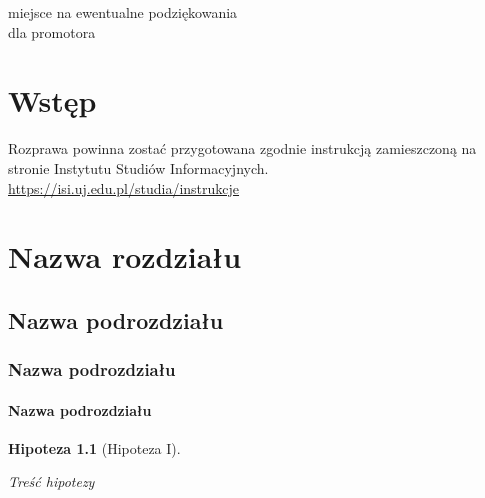 \documentclass[twoside,a4paper,12pt]{report} %
\theoremstyle{break}
\newtheorem{hip}{Hipoteza}[chapter]
\begin{document}
\vspace*{16cm}
\begin{flushright}
miejsce na ewentualne podziękowania\\
dla promotora%
\end{flushright}

\thispagestyle{empty} 
\tableofcontents %


\chapter*{Wstęp}

Rozprawa powinna zostać przygotowana zgodnie instrukcją zamieszczoną na stronie Instytutu Studiów Informacyjnych.\medskip \\
\url{https://isi.uj.edu.pl/studia/instrukcje}\bigskip

\lipsum[1]%


\chapter{Nazwa rozdziału}

\lipsum[1-2]\par%

\section{Nazwa podrozdziału}
\lipsum[1]%


\subsection{Nazwa podrozdziału}

\lipsum[1]%

\subsubsection{Nazwa podrozdziału}

\lipsum[1]%

\begin{hip}[Hipoteza I]

\label{t1}%

Treść hipotezy

\end{hip}
\end{document}
